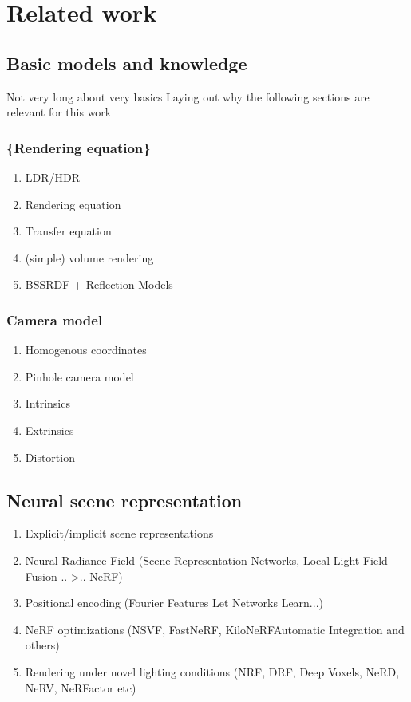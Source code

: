 \chapter{Related work}
\label{chap:related_work}

\section{Basic models and knowledge}

Not very long about very basics
Laying out why the following sections are relevant for this work

\subsection{\{Rendering equation\} }
\begin{enumerate}
    \item LDR/HDR
    \item Rendering equation
    \item Transfer equation
    \item (simple) volume rendering
    \item BSSRDF + Reflection Models
\end{enumerate}


\subsection{Camera model}
\begin{enumerate}
    \item Homogenous coordinates
    \item Pinhole camera model
    \item Intrinsics
    \item Extrinsics
    \item Distortion
\end{enumerate}


\section{Neural scene representation}


\begin{enumerate}
    \item Explicit/implicit scene representations
    \item Neural Radiance Field (Scene Representation Networks, Local Light Field Fusion ..->.. NeRF)
    \item Positional encoding (Fourier Features Let Networks Learn...) %
    \item NeRF optimizations (NSVF, FastNeRF, KiloNeRFAutomatic Integration and others)
    \item Rendering under novel lighting conditions (NRF, DRF, Deep Voxels, NeRD, NeRV, NeRFactor etc)
\end{enumerate}


